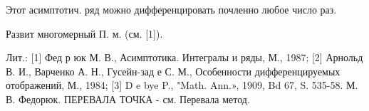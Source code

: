 \documentclass[10pt]{article}
\begin{document}
Этот асимптотич. ряд можно дифференцировать почленно любое число раз.



Развит многомерный П. м. (см. [1]).



Лит.: [1] Фед р юк М. В., Асимптотика. Интегралы и ряды, М., 1987; [2] Арнольд В. И., Варченко А. Н., Гусейн-зад е С. М., Особенности дифференцируемых отображений, М., 1984; [3] D e bye P., "Math. Ann.», 1909, Bd 67, S. 535-58. М. В. Федорюк. ПЕРЕВАЛА ТОЧКА - см. Перевала метод.
\end{document}
